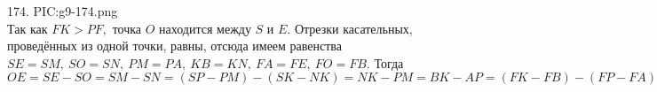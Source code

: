 174. {{PIC:g9-174.png}}\\
Так как $FK>PF,$ точка $O$ находится между $S$ и $E.$ Отрезки касательных, проведённых из одной точки, равны, отсюда имеем равенства $SE = SM,\ SO = SN,\ PM =
PA,\ KB = KN,\  FA = FE,\  FO = FB.$ Тогда $OE = SE - SO = SM - SN = (SP - PM) - (SK - NK) = NK - PM =
BK - AP = (FK - FB) - (FP - FA) = FA - FB + 2 = FE - FO + 2 =
2 - OE \Rightarrow 2OE = 2\Rightarrow OE=1.$\\

